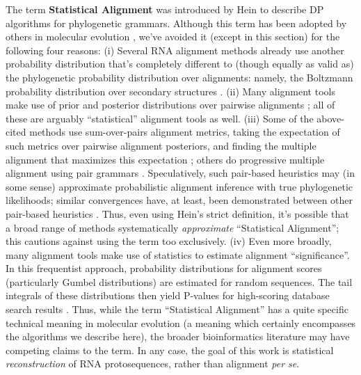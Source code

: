 \documentclass[10pt]{article}
\begin{document}
The term {\bf Statistical Alignment} was introduced by Hein \cite{HeinEtal2000}
to describe DP algorithms for phylogenetic grammars.
Although this term has been adopted by others in molecular evolution \cite{Miklos2002,Metzler2003,DrummondRambaut2007,SatijaEtAl2008},
we've avoided it (except in this section) for the following four reasons:
(i) Several RNA alignment methods already use another probability distribution
that's completely different to (though equally as valid as) the phylogenetic probability distribution over alignments:
namely, the Boltzmann probability distribution over secondary structures
\cite{GorodkinEtAl97,MathewsTurner02,HofackerEtAl2004}.
(ii) Many alignment tools make use of prior and posterior distributions over pairwise alignments
\cite{Miyazawa94,BucherHofmann96,Holmes98,BrayPachter2004,DoEtAl2004,Holmes2005,LoytynojaGoldman2005,SchwartzPachter2007,BradleyPachterHolmes2008};
all of these are arguably ``statistical'' alignment tools as well.
(iii) Some of the above-cited methods use sum-over-pairs alignment metrics, taking the expectation of such metrics over pairwise alignment posteriors,
and finding the multiple alignment that maximizes this expectation \cite{DoEtAl2004,SchwartzPachter2007,BradleyPachterHolmes2008};
others do progressive multiple alignment using pair grammars \cite{BrayPachter2004,Holmes2005,LoytynojaGoldman2005}.
Speculatively, such pair-based heuristics may (in some sense) approximate probabilistic alignment inference with true phylogenetic likelihoods;
similar convergences have, at least, been demonstrated between other pair-based heuristics \cite{EickmeyerEtAl2008}.
Thus, even using Hein's strict definition,
it's possible that a broad range of methods systematically {\em approximate} ``Statistical Alignment'';
this cautions against using the term too exclusively.
(iv) Even more broadly, many alignment tools make use of statistics to estimate alignment ``significance''.
In this frequentist approach, probability distributions for alignment scores (particularly Gumbel distributions)
are estimated for random sequences.
The tail integrals of these distributions then yield P-values for high-scoring database search results
\cite{KarlinAltschul93,Mott2000,Eddy2008}.
Thus, while the term ``Statistical Alignment'' has a quite specific technical meaning in molecular evolution
(a meaning which certainly encompasses the algorithms we describe here),
the broader bioinformatics literature may have competing claims to the term.
In any case, the goal of this work is statistical {\em reconstruction} of RNA protosequences,
rather than alignment {\em per se}.
\end{document}
